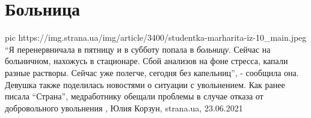  
 
 
 
 
\chapter{Больница}

\ifcmt
  pic https://img.strana.ua/img/article/3400/studentka-marharita-iz-10_main.jpeg
\fi
\enquote{Я перенервничала в пятницу и в субботу попала в \emph{больницу}. Сейчас на
больничном, нахожусь в стационаре. Сбой анализов на фоне стресса, капали разные
растворы. Сейчас уже полегче, сегодня без капельниц}, - сообщила она.  Девушка
также поделилась новостями о ситуации с увольнением. Как ранее писала \enquote{Страна},
медработнику обещали проблемы в случае отказа от добровольного увольнения
, Юлия Корзун, strana.ua, 23.06.2021
